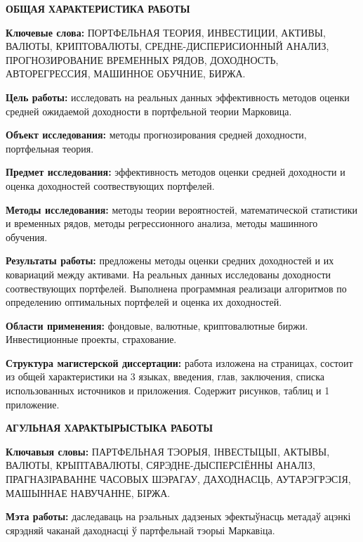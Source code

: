 \newpage
{}


\begin{center}
	\textbf{\large ОБЩАЯ ХАРАКТЕРИСТИКА РАБОТЫ}
\end{center}


\textbf{Ключевые слова:}
ПОРТФЕЛЬНАЯ ТЕОРИЯ, ИНВЕСТИЦИИ, АКТИВЫ, ВАЛЮТЫ, КРИПТОВАЛЮТЫ, СРЕДНЕ-ДИСПЕРИСИОННЫЙ АНАЛИЗ, ПРОГНОЗИРОВАНИЕ ВРЕМЕННЫХ РЯДОВ,
ДОХОДНОСТЬ, АВТОРЕГРЕССИЯ, МАШИННОЕ ОБУЧНИЕ, БИРЖА.

\textbf{Цель работы:} 
исследовать на реальных данных эффективность методов оценки средней ожидаемой доходности в портфельной теории Марковица.

\textbf{Объект исследования:} 
методы прогнозирования средней доходности, портфельная теория.

\textbf{Предмет исследования:}
эффективность методов оценки средней доходности и оценка доходностей соотвествующих портфелей.

\textbf{Методы исследования:}
методы теории вероятностей, математической статистики и временных рядов, методы регрессионного анализа, методы машинного обучения.

\textbf{Результаты работы:}
предложены методы оценки средних доходностей и их ковариаций между активами. На реальных данных исследованы доходности соотвествующих портфелей.
Выполнена программная реализаци алгоритмов по определению оптимальных портфелей и оценка их доходностей.

\textbf{Области применения:}
фондовые, валютные, криптовалютные биржи. Инвестиционные проекты, страхование.

\textbf{Структура магистерской диссертации:}
работа изложена на \pageref{LastPage} страницах, состоит из общей характеристики на 3 языках, введения, 
\totalchapters{} глав, заключения, списка использованных источников и приложения.
Содержит \totalfigures{} рисунков, \totaltables{} таблиц и 1 приложение.

\newpage
{}
\begin{center}
	\textbf{\large АГУЛЬНАЯ ХАРАКТЫРЫСТЫКА РАБОТЫ}
\end{center}

\textbf{Ключавыя словы:}
ПАРТФЕЛЬНАЯ ТЭОРЫЯ, IНВЕСТЫЦЫI, АКТЫВЫ, ВАЛЮТЫ, КРЫПТАВАЛЮТЫ, СЯРЭДНЕ-ДЫСПЕРСIЁННЫ АНАЛІЗ, ПРАГНАЗІРАВАННЕ ЧАСОВЫХ ШЭРАГАУ,
ДАХОДНАСЦЬ, АУТАРЭГРЭСIЯ, МАШЫННАЕ НАВУЧАННЕ, БIРЖА.

\textbf{Мэта работы:} 
даследаваць на рэальных дадзеных эфектыўнасць метадаў ацэнкі сярэдняй чаканай даходнасці ў партфельнай тэорыі Маркавiца.

